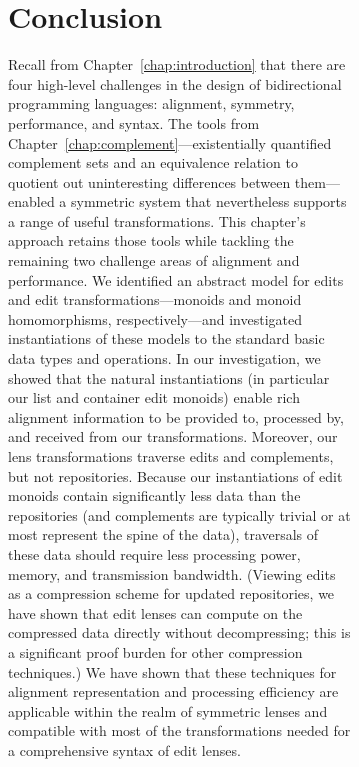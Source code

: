 \begin{figure}
\begin{figure}
\section{Conclusion}
\label{sec:delta-conclusion}
Recall from Chapter~\ref{chap:introduction} that there are four high-level
challenges in the design of bidirectional programming languages: alignment,
symmetry, performance, and syntax. The tools from
Chapter~\ref{chap:complement}---existentially quantified complement sets and
an equivalence relation to quotient out uninteresting differences between
them---enabled a symmetric system that nevertheless supports a range of
useful transformations. This chapter's approach retains those tools while
tackling the remaining two challenge areas of alignment and performance. We
identified an abstract model for edits and edit transformations---monoids
and monoid homomorphisms, respectively---and investigated instantiations of
these models to the standard basic data types and operations. In our
investigation, we showed that the natural instantiations (in particular our
list and container edit monoids) enable rich alignment information to be
provided to, processed by, and received from our transformations. Moreover,
our lens transformations traverse edits and complements, but not
repositories. Because our instantiations of edit monoids contain
significantly less data than the repositories (and complements are typically
trivial or at most represent the spine of the data), traversals of these
data should require less processing power, memory, and transmission
bandwidth. (Viewing edits as a compression scheme for updated repositories,
we have shown that edit lenses can compute on the compressed data directly
without decompressing; this is a significant proof burden for other
compression techniques.) We have shown that these techniques for alignment
representation and processing efficiency are applicable within the realm of
symmetric lenses and compatible with most of the transformations needed for
a comprehensive syntax of edit lenses.
\fi%



\end{figure}
\end{figure}
